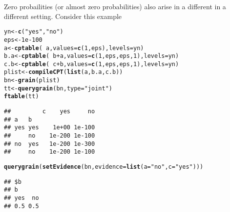 \documentclass[10pt]{article}\usepackage[]{graphicx}\usepackage[]{color}
\makeatletter
\newcommand{\hlnum}[1]{\textcolor[rgb]{0.686,0.059,0.569}{#1}}%
\newcommand{\hlstr}[1]{\textcolor[rgb]{0.192,0.494,0.8}{#1}}%
\newcommand{\hlopt}[1]{\textcolor[rgb]{0,0,0}{#1}}%
\newcommand{\hlstd}[1]{\textcolor[rgb]{0.345,0.345,0.345}{#1}}%
\newcommand{\hlkwb}[1]{\textcolor[rgb]{0.69,0.353,0.396}{#1}}%
\newcommand{\hlkwc}[1]{\textcolor[rgb]{0.333,0.667,0.333}{#1}}%
\newcommand{\hlkwd}[1]{\textcolor[rgb]{0.737,0.353,0.396}{\textbf{#1}}}%
\newenvironment{kframe}{%
 \def\at@end@of@kframe{}%
 \ifinner\ifhmode%
  \def\at@end@of@kframe{\end{minipage}}%
  \begin{minipage}{\columnwidth}%
 \fi\fi%
 \def\FrameCommand##1{\hskip\@totalleftmargin \hskip-\fboxsep
 \colorbox{shadecolor}{##1}\hskip-\fboxsep
     \hskip-\linewidth \hskip-\@totalleftmargin \hskip\columnwidth}%
 \MakeFramed {\advance\hsize-\width
   \@totalleftmargin\z@ \linewidth\hsize
   \@setminipage}}%
 {\par\unskip\endMakeFramed%
 \at@end@of@kframe}
\newenvironment{knitrout}{}{} %
\makeatother
\begin{document}
Zero probailities (or almost zero probabilities) also arise in a
different in a different setting. Consider this example

\begin{knitrout}
\color{fgcolor}\begin{kframe}
\begin{alltt}
\hlstd{yn} \hlkwb{<-} \hlkwd{c}\hlstd{(}\hlstr{"yes"}\hlstd{,}\hlstr{"no"}\hlstd{)}
\hlstd{eps} \hlkwb{<-} \hlnum{1e-100}
\hlstd{a}    \hlkwb{<-} \hlkwd{cptable}\hlstd{(}\hlopt{~}\hlstd{a,}   \hlkwc{values}\hlstd{=}\hlkwd{c}\hlstd{(}\hlnum{1}\hlstd{, eps),} \hlkwc{levels}\hlstd{=yn)}
\hlstd{b.a}  \hlkwb{<-} \hlkwd{cptable}\hlstd{(}\hlopt{~}\hlstd{b}\hlopt{+}\hlstd{a,} \hlkwc{values}\hlstd{=}\hlkwd{c}\hlstd{(}\hlnum{1}\hlstd{, eps, eps,} \hlnum{1}\hlstd{),} \hlkwc{levels}\hlstd{=yn)}
\hlstd{c.b}  \hlkwb{<-} \hlkwd{cptable}\hlstd{(}\hlopt{~}\hlstd{c}\hlopt{+}\hlstd{b,} \hlkwc{values}\hlstd{=}\hlkwd{c}\hlstd{(}\hlnum{1}\hlstd{, eps, eps,} \hlnum{1}\hlstd{),} \hlkwc{levels}\hlstd{=yn)}
\hlstd{plist} \hlkwb{<-} \hlkwd{compileCPT}\hlstd{(}\hlkwd{list}\hlstd{(a, b.a, c.b))}
\hlstd{bn}   \hlkwb{<-} \hlkwd{grain}\hlstd{(plist)}
\hlstd{tt}   \hlkwb{<-} \hlkwd{querygrain}\hlstd{(bn,} \hlkwc{type}\hlstd{=}\hlstr{"joint"}\hlstd{)}
\hlkwd{ftable}\hlstd{(tt)}
\end{alltt}
\begin{verbatim}
##         c    yes     no
## a   b                  
## yes yes    1e+00 1e-100
##     no    1e-200 1e-100
## no  yes   1e-200 1e-300
##     no    1e-200 1e-100
\end{verbatim}
\begin{alltt}
\hlkwd{querygrain}\hlstd{(}\hlkwd{setEvidence}\hlstd{(bn,} \hlkwc{evidence}\hlstd{=}\hlkwd{list}\hlstd{(}\hlkwc{a}\hlstd{=}\hlstr{"no"}\hlstd{,} \hlkwc{c}\hlstd{=}\hlstr{"yes"}\hlstd{)))}
\end{alltt}
\begin{verbatim}
## $b
## b
## yes  no 
## 0.5 0.5
\end{verbatim}
\end{kframe}
\end{knitrout}
\end{document}
